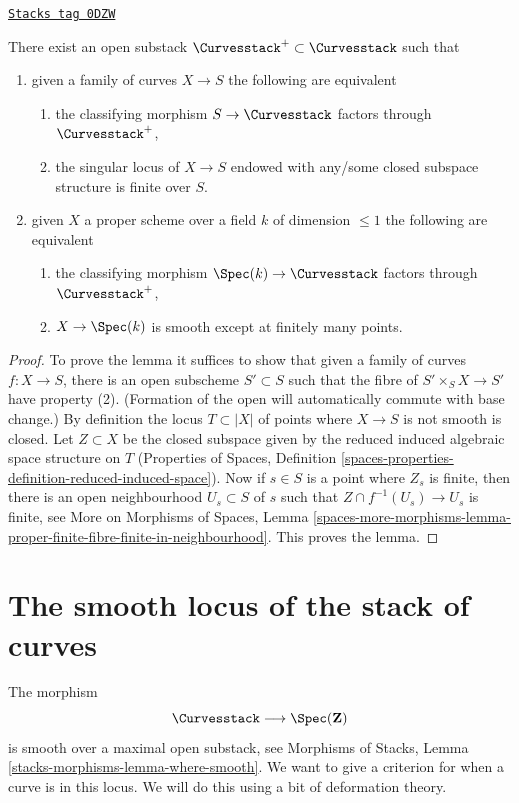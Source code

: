 \begin{lemma}
\label{moduli-curves-lemma-isolated-sings-curves}
\href{https://stacks.math.columbia.edu/tag/0DZW}{\texttt{Stacks tag 0DZW}}

There exist an open substack
$\Curvesstack^{+} \subset \Curvesstack$
such that
\begin{enumerate}
\item given a family of curves $X \to S$ the following are equivalent
\begin{enumerate}
\item the classifying morphism $S \to \Curvesstack$ factors through
$\Curvesstack^{+}$,
\item the singular locus of $X \to S$ endowed
with any/some closed subspace structure is finite over $S$.
\end{enumerate}
\item given $X$ a proper scheme over a field $k$ of dimension $\leq 1$
the following are equivalent
\begin{enumerate}
\item the classifying morphism $\Spec(k) \to \Curvesstack$ factors
through $\Curvesstack^{+}$,
\item $X \to \Spec(k)$ is smooth except at finitely many points.
\end{enumerate}
\end{enumerate}
\end{lemma}

\begin{proof}
To prove the lemma it suffices to show that given a family of curves
$f : X \to S$, there is an open subscheme $S' \subset S$
such that the fibre of $S' \times_S X \to S'$ have property (2).
(Formation of the open will automatically commute with base change.)
By definition the locus $T \subset |X|$ of points where $X \to S$
is not smooth is closed. Let $Z \subset X$ be the closed subspace
given by the reduced induced algebraic space structure on $T$
(Properties of Spaces, Definition
\ref{spaces-properties-definition-reduced-induced-space}).
Now if $s \in S$ is a point where $Z_s$ is finite, then there
is an open neighbourhood $U_s \subset S$ of $s$ such that
$Z \cap f^{-1}(U_s) \to U_s$ is finite, see
More on Morphisms of Spaces, Lemma
\ref{spaces-more-morphisms-lemma-proper-finite-fibre-finite-in-neighbourhood}.
This proves the lemma.
\end{proof}

\section{The smooth locus of the stack of curves}
\label{moduli-curves-section-smooth}
The morphism
$$
\Curvesstack \longrightarrow \Spec(\mathbf{Z})
$$
is smooth over a maximal open substack, see
Morphisms of Stacks, Lemma \ref{stacks-morphisms-lemma-where-smooth}.
We want to give a criterion for when a curve is in this locus.
We will do this using a bit of deformation theory.

